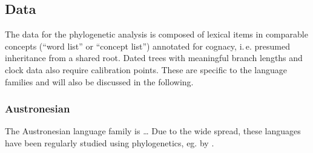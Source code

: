 \documentclass[a4paper,12pt]{scrartcl}
\begin{document}
\subsection{Data}
The data for the phylogenetic analysis is composed of lexical items in comparable concepts (“word list” or “concept list”) annotated
for cognacy, i.\,e. presumed inheritance from a shared root. Dated trees with meaningful branch lengths and clock data also require calibration points.
These are specific to the language families and will also be discussed in the following.

\subsubsection{Austronesian}

The Austronesian language family is …
Due to the wide spread, these languages have been regularly studied using phylogenetics, eg. by
\textcite{gray2009language,greenhill2017evolutionary,greenhill2018population}.
\end{document}
